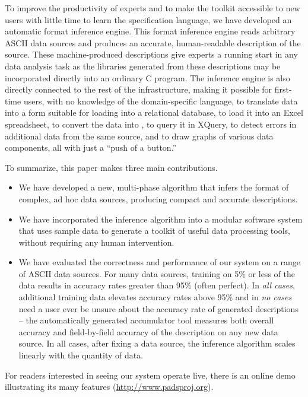 To improve the productivity of experts and to 
make the \pads{} toolkit accessible to new users with 
little time to learn the specification language,
we have developed an automatic format inference engine.
This format inference engine reads arbitrary ASCII data sources
and produces an accurate, human-readable \pads{} description of the source.
These machine-produced descriptions give experts a running start
in any data analysis task as the libraries generated from these
descriptions may be incorporated directly into an ordinary C program.
The inference engine is also directly connected to the rest of the
\pads{} infrastructure, making it possible for first-time users,
with no knowledge of the \pads{} domain-specific language, 
to translate data into a form suitable for loading into a relational database, 
to load it into an Excel spreadsheet,
to convert the data into \xml{},
to query it in XQuery,
to detect errors in additional data from the same source,
and to draw graphs of various data components, all
with just a ``push of a button.''

To summarize, this paper makes three main contributions.

\begin{itemize}
\item We have developed a new, multi-phase algorithm 
that infers the format of complex, ad hoc data sources,
producing compact and accurate \pads{} descriptions.

\item We have incorporated the inference algorithm into 
a modular software system that uses sample data to
generate a toolkit of useful data processing tools,
without requiring any human intervention.
 
\item We have evaluated the correctness and performance of
our system on a range of ASCII data sources.  For many data
sources, training on 5\% or less of the data results in
accuracy rates greater than 95\% (often perfect).  
In {\em all cases}, additional
training data elevates accuracy rates above 95\% and
in {\em no cases} need a user ever be unsure about the
accuracy rate of generated descriptions -- the automatically
generated accumulator tool measures both overall accuracy
and field-by-field accuracy of the description on any new
data source.
In all cases, after fixing a data source, the 
inference algorithm scales linearly with the quantity of
data.
\end{itemize}
\noindent
For readers interested in seeing our system operate live, 
there is an online demo illustrating its many features
(\url{http://www.padsproj.org}).  


